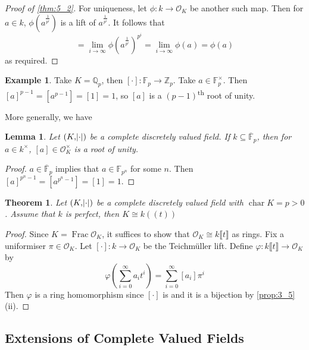 \documentclass[11pt]{article}
\theoremstyle{definition}
\newtheorem*{example}{Example}
\theoremstyle{plain}
\newtheorem{theorem}[definition]{Theorem}
\newtheorem{lemma}[definition]{Lemma}
\theoremstyle{remark}
\DeclareMathOperator{\Frac}{Frac}
\DeclareMathOperator{\Char}{char}
\newcommand{\FF}{\mathbb{F}}
\newcommand{\ZZ}{\mathbb{Z}}
\newcommand{\QQ}{\mathbb{Q}}
\newcommand{\cO}{\mathcal{O}}
\begin{document}
\begin{proof}[Proof of \autoref{thm:5_2}]
    For uniqueness, let $\phi : k \to \cO_K$ be another such map. Then for $a \in k$, $\phi(a^\frac{1}{p^i})$ is a lift of $a^\frac{1}{p^i}$. It follows that
    \begin{equation*}
        [a] = \lim_{i \to \infty} \phi(a^\frac{1}{p^i})^{p^i} = \lim_{i \to \infty} \phi(a) = \phi(a)
    \end{equation*}
    as required.
\end{proof}

\begin{example}
    Take $K = \QQ_p$, then $[\cdot] : \FF_p \to \ZZ_p$. Take $a \in \FF_p^\times$. Then $[a]^{p-1} = [a^{p-1}] = [1] = 1$, so $[a]$ is a $(p-1)$\textsuperscript{th} root of unity.
\end{example}

\noindent More generally, we have


\begin{lemma}\label{lem:5_6}
    Let $(K, \abs{\cdot})$ be a complete discretely valued field. If $k \subseteq \overline{\FF}_p$, then for $a \in k^\times$, $[a] \in \cO_K^\times$ is a root of unity.
\end{lemma}
\begin{proof}
    $a \in \overline{\FF}_p$ implies that $a \in \FF_{p^n}$ for some $n$. Then $[a]^{p^n-1} = [a^{p^n-1}] = [1] = 1$.
\end{proof}

\begin{theorem}\label{thm:5_7}
    Let $(K, \abs{\cdot})$ be a complete discretely valued field with $\Char K = p > 0$ . Assume that $k$ is perfect, then $K \cong k((t))$
\end{theorem}
\begin{proof}
    Since $K = \Frac{\cO_K}$, it suffices to show that $\cO_K \cong k\llbracket t \rrbracket$ as rings. Fix a uniformiser $\pi \in \cO_K$. Let $[\cdot] : k \to \cO_K$ be the Teichm\"uller lift. Define $\varphi : k\llbracket t \rrbracket \to \cO_K$ by
    \begin{equation*}
        \varphi\left(\sum_{i=0}^\infty a_i t^i\right) = \sum_{i=0}^\infty [a_i] \pi^i
    \end{equation*}
    Then $\varphi$ is a ring homomorphism since $[\cdot]$ is and it is a bijection by \autoref{prop:3_5} (ii).
\end{proof}

\subsection{Extensions of Complete Valued Fields}
\end{document}
